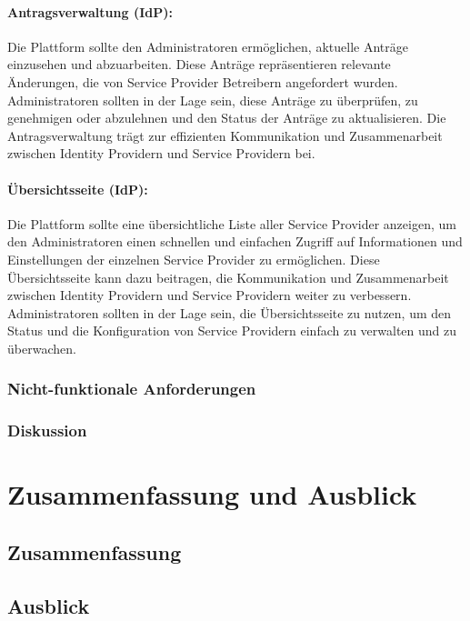 \documentclass[a4paper, fontsize=11pt]{scrartcl}
\begin{document}
\paragraph{Antragsverwaltung (IdP):}
Die Plattform sollte den Administratoren ermöglichen, aktuelle Anträge einzusehen und abzuarbeiten. Diese Anträge repräsentieren relevante Änderungen, die von Service Provider Betreibern angefordert wurden.
Administratoren sollten in der Lage sein, diese Anträge zu überprüfen, zu genehmigen oder abzulehnen und den Status der Anträge zu aktualisieren.
Die Antragsverwaltung trägt zur effizienten Kommunikation und Zusammenarbeit zwischen Identity Providern und Service Providern bei.

\paragraph{Übersichtsseite (IdP):}
Die Plattform sollte eine übersichtliche Liste aller Service Provider anzeigen, um den Administratoren einen schnellen und einfachen Zugriff auf Informationen und Einstellungen der einzelnen Service Provider zu ermöglichen.
Diese Übersichtsseite kann dazu beitragen, die Kommunikation und Zusammenarbeit zwischen Identity Providern und Service Providern weiter zu verbessern. 
Administratoren sollten in der Lage sein, die Übersichtsseite zu nutzen, um den Status und die Konfiguration von Service Providern einfach zu verwalten und zu überwachen.
\subsubsection{Nicht-funktionale Anforderungen}\label{subsubsec:non-functional-requirements}
\subsubsection{Diskussion}\label{subsubsec:anforderungsanalyse-discussion}

\section{Zusammenfassung und Ausblick}\label{sec:summary}
\subsection{Zusammenfassung}\label{subsec:summary}
\subsection{Ausblick}\label{subsec:outlook}

\newpage

\printbibliography{}
\listoffigures
\end{document}
